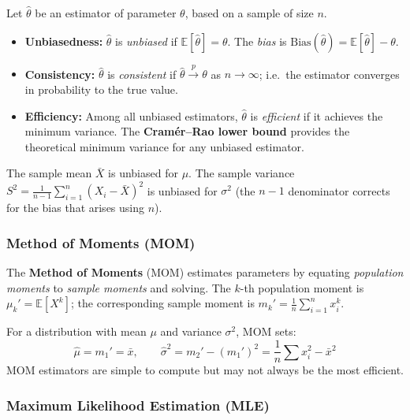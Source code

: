 \begin{definition}
Let $\hat{\theta}$ be an estimator of parameter $\theta$, based on a sample of size $n$.
\begin{itemize}
    \item \textbf{Unbiasedness:} $\hat{\theta}$ is \emph{unbiased} if $\mathbb{E}[\hat{\theta}] = \theta$. The \emph{bias} is $\mathrm{Bias}(\hat{\theta}) = \mathbb{E}[\hat{\theta}] - \theta$.
    \item \textbf{Consistency:} $\hat{\theta}$ is \emph{consistent} if $\hat{\theta} \xrightarrow{p} \theta$ as $n \to \infty$; i.e.\ the estimator converges in probability to the true value.
    \item \textbf{Efficiency:} Among all unbiased estimators, $\hat{\theta}$ is \emph{efficient} if it achieves the minimum variance. The \textbf{Cramér--Rao lower bound} provides the theoretical minimum variance for any unbiased estimator.
\end{itemize}
\end{definition}

\begin{example}
The sample mean $\bar{X}$ is unbiased for $\mu$. The sample variance $S^2 = \frac{1}{n-1}\sum_{i=1}^n (X_i - \bar{X})^2$ is unbiased for $\sigma^2$ (the $n-1$ denominator corrects for the bias that arises using $n$).
\end{example}

\subsubsection*{Method of Moments (MOM)}

\begin{definition}
The \textbf{Method of Moments} (MOM) estimates parameters by equating \emph{population moments} to \emph{sample moments} and solving. The $k$-th population moment is $\mu_k' = \mathbb{E}[X^k]$; the corresponding sample moment is $m_k' = \frac{1}{n}\sum_{i=1}^n x_i^k$.
\end{definition}

\begin{example}
For a distribution with mean $\mu$ and variance $\sigma^2$, MOM sets:
\[
\hat{\mu} = m_1' = \bar{x}, \qquad \hat{\sigma}^2 = m_2' - (m_1')^2 = \frac{1}{n}\sum x_i^2 - \bar{x}^2
\]
MOM estimators are simple to compute but may not always be the most efficient.
\end{example}

\subsubsection*{Maximum Likelihood Estimation (MLE)}

